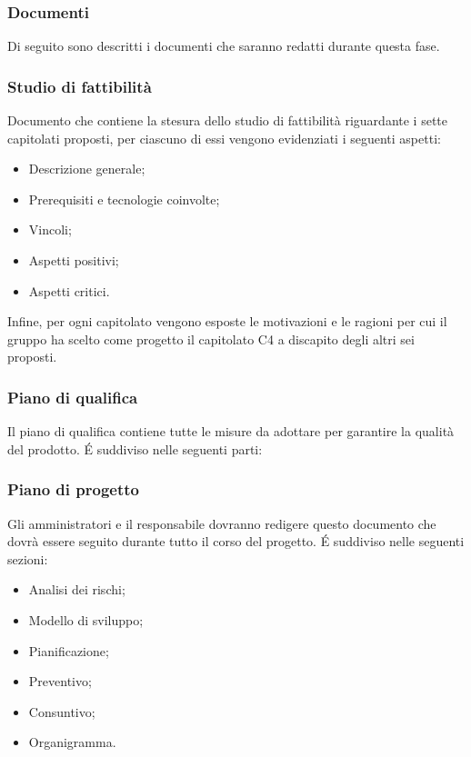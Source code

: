\subsubsection{Documenti}
Di seguito sono descritti i documenti che saranno redatti durante questa fase.
\subsubsection{Studio di fattibilità}
Documento che contiene la stesura dello studio di fattibilità riguardante i sette capitolati proposti, per ciascuno di essi vengono evidenziati i seguenti aspetti:
\begin{itemize}
    \item Descrizione generale;
    \item Prerequisiti e tecnologie coinvolte;
    \item Vincoli;
    \item Aspetti positivi;
    \item Aspetti critici.
\end{itemize}
Infine, per ogni capitolato vengono esposte le motivazioni e le ragioni per cui il gruppo ha scelto come progetto il capitolato C4 \NomeProgetto{} a discapito degli altri sei proposti.\\

\subsubsection{Piano di qualifica}
Il piano di qualifica contiene tutte le misure da adottare per garantire la qualità del prodotto. \'E suddiviso nelle seguenti parti:
\begin{itemize}

\end{itemize} 
\subsubsection{Piano di progetto}
Gli amministratori e il responsabile dovranno redigere questo documento che dovrà essere seguito durante tutto il corso del progetto. \'E suddiviso nelle seguenti sezioni:
\begin{itemize}
    \item Analisi dei rischi;
    \item Modello di sviluppo;
   \item Pianificazione;  
    \item Preventivo;
    \item Consuntivo;
    \item Organigramma.   
\end{itemize}